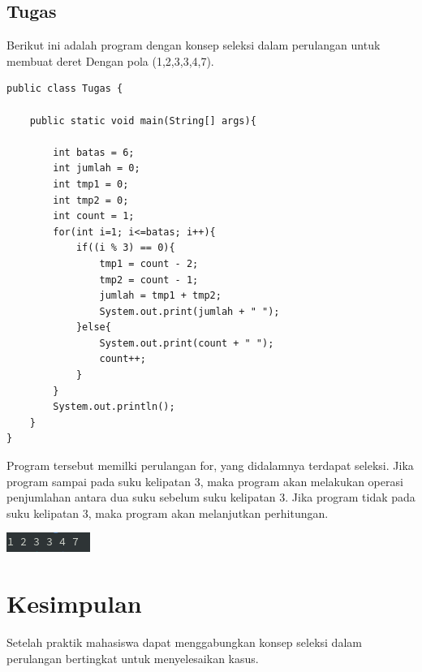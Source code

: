 \documentclass[a4paper,12pt]{article}
\begin{document}
\subsection{Tugas}
Berikut ini adalah program dengan konsep seleksi dalam perulangan untuk membuat deret Dengan pola (1,2,3,3,4,7).
\begin{lstlisting}
public class Tugas {

    public static void main(String[] args){

        int batas = 6;
        int jumlah = 0;
        int tmp1 = 0;
        int tmp2 = 0;
        int count = 1;
        for(int i=1; i<=batas; i++){
            if((i % 3) == 0){
                tmp1 = count - 2;
                tmp2 = count - 1;
                jumlah = tmp1 + tmp2;
                System.out.print(jumlah + " ");
            }else{
                System.out.print(count + " ");
                count++;
            }
        }
        System.out.println();
    }
}
\end{lstlisting}
Program tersebut memilki perulangan for, yang didalamnya terdapat seleksi. Jika program sampai pada suku kelipatan 3,
maka program akan melakukan operasi penjumlahan antara dua suku sebelum suku kelipatan 3. Jika program tidak pada suku
kelipatan 3, maka program akan melanjutkan perhitungan.
\begin{center}
    \includegraphics[scale=1]{7.png}
\end{center}

\newpage

\section{Kesimpulan}
Setelah praktik mahasiswa dapat menggabungkan konsep seleksi dalam perulangan bertingkat untuk menyelesaikan kasus.
\end{document}
